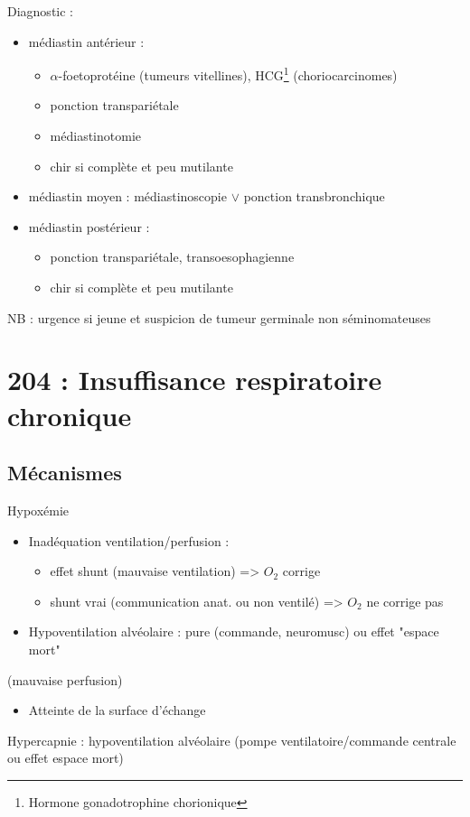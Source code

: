 \documentclass{article}
\begin{document}
Diagnostic :
\begin{itemize}
\item médiastin antérieur : 
  \begin{itemize}
  \item $\alpha$-foetoprotéine (tumeurs vitellines), HCG\footnote{Hormone gonadotrophine chorionique} (choriocarcinomes)
  \item ponction transpariétale
  \item médiastinotomie
  \item chir si complète et peu mutilante
  \end{itemize}
\item médiastin moyen : médiastinoscopie $\vee$ ponction transbronchique
\item médiastin postérieur : 
  \begin{itemize}
  \item ponction transpariétale, transoesophagienne
  \item chir si complète et peu mutilante
  \end{itemize}
\end{itemize}

NB : urgence si jeune et suspicion de tumeur germinale non séminomateuses

\section{204 : Insuffisance respiratoire chronique}
\label{sec:org6d633b6}
\subsection{Mécanismes}
\label{sec:org47f478d}
Hypoxémie
\begin{itemize}
\item Inadéquation ventilation/perfusion :
  \begin{itemize}
  \item effet shunt (mauvaise ventilation) => $O_2$ corrige
  \item shunt vrai (communication anat. ou non ventilé) => $O_2$ ne corrige
  pas
  \end{itemize}
\item Hypoventilation alvéolaire : pure (commande, neuromusc) ou effet "espace mort"
\end{itemize}
(mauvaise perfusion)
\begin{itemize}
\item Atteinte de la surface d'échange
\end{itemize}
Hypercapnie : hypoventilation alvéolaire (pompe ventilatoire/commande centrale
ou effet espace mort)
\end{document}
